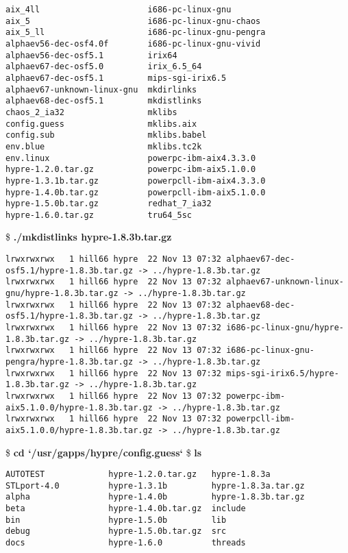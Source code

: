 \begin{ttfamily}
\begin{mdseries}
\begin{verbatim}
aix_4ll                      i686-pc-linux-gnu
aix_5                        i686-pc-linux-gnu-chaos
aix_5_ll                     i686-pc-linux-gnu-pengra
alphaev56-dec-osf4.0f        i686-pc-linux-gnu-vivid
alphaev56-dec-osf5.1         irix64
alphaev67-dec-osf5.0         irix_6.5_64
alphaev67-dec-osf5.1         mips-sgi-irix6.5
alphaev67-unknown-linux-gnu  mkdirlinks
alphaev68-dec-osf5.1         mkdistlinks
chaos_2_ia32                 mklibs
config.guess                 mklibs.aix
config.sub                   mklibs.babel
env.blue                     mklibs.tc2k
env.linux                    powerpc-ibm-aix4.3.3.0
hypre-1.2.0.tar.gz           powerpc-ibm-aix5.1.0.0
hypre-1.3.1b.tar.gz          powerpcll-ibm-aix4.3.3.0
hypre-1.4.0b.tar.gz          powerpcll-ibm-aix5.1.0.0
hypre-1.5.0b.tar.gz          redhat_7_ia32
hypre-1.6.0.tar.gz           tru64_5sc
\end{verbatim}
\$ \textbf{./mkdistlinks hypre-1.8.3b.tar.gz}\linebreak
\begin{verbatim}
lrwxrwxrwx   1 hill66 hypre  22 Nov 13 07:32 alphaev67-dec-osf5.1/hypre-1.8.3b.tar.gz -> ../hypre-1.8.3b.tar.gz
lrwxrwxrwx   1 hill66 hypre  22 Nov 13 07:32 alphaev67-unknown-linux-gnu/hypre-1.8.3b.tar.gz -> ../hypre-1.8.3b.tar.gz
lrwxrwxrwx   1 hill66 hypre  22 Nov 13 07:32 alphaev68-dec-osf5.1/hypre-1.8.3b.tar.gz -> ../hypre-1.8.3b.tar.gz
lrwxrwxrwx   1 hill66 hypre  22 Nov 13 07:32 i686-pc-linux-gnu/hypre-1.8.3b.tar.gz -> ../hypre-1.8.3b.tar.gz
lrwxrwxrwx   1 hill66 hypre  22 Nov 13 07:32 i686-pc-linux-gnu-pengra/hypre-1.8.3b.tar.gz -> ../hypre-1.8.3b.tar.gz
lrwxrwxrwx   1 hill66 hypre  22 Nov 13 07:32 mips-sgi-irix6.5/hypre-1.8.3b.tar.gz -> ../hypre-1.8.3b.tar.gz
lrwxrwxrwx   1 hill66 hypre  22 Nov 13 07:32 powerpc-ibm-aix5.1.0.0/hypre-1.8.3b.tar.gz -> ../hypre-1.8.3b.tar.gz
lrwxrwxrwx   1 hill66 hypre  22 Nov 13 07:32 powerpcll-ibm-aix5.1.0.0/hypre-1.8.3b.tar.gz -> ../hypre-1.8.3b.tar.gz
\end{verbatim}
\$ \textbf{cd `/usr/gapps/hypre/config.guess`}\linebreak
\$ \textbf{ls}\linebreak
\begin{verbatim}
AUTOTEST             hypre-1.2.0.tar.gz   hypre-1.8.3a
STLport-4.0          hypre-1.3.1b         hypre-1.8.3a.tar.gz
alpha                hypre-1.4.0b         hypre-1.8.3b.tar.gz
beta                 hypre-1.4.0b.tar.gz  include
bin                  hypre-1.5.0b         lib
debug                hypre-1.5.0b.tar.gz  src
docs                 hypre-1.6.0          threads

\end{verbatim}
\end{mdseries}
\end{ttfamily}
